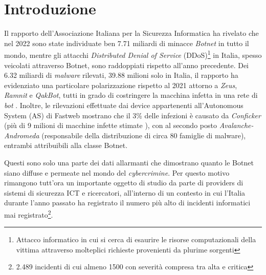 
\chapter{Introduzione}
Il rapporto dell'Associazione Italiana per la Sicurezza Informatica \cite{Clusit} ha rivelato che nel 2022 sono state individuate ben 7.71 miliardi di minacce \textit{Botnet} in tutto il mondo, mentre gli attacchi \textit{Distributed Denial of Service} (DDoS)\footnote{Attacco informatico in cui si cerca di esaurire le risorse computazionali della vittima attraverso molteplici richieste provenienti da plurime sorgenti} in Italia, spesso veicolati attraverso Botnet, sono raddoppiati rispetto all'anno precedente. Dei 6.32 miliardi di \textit{malware} rilevati, 39.88 milioni solo in Italia, il rapporto ha evidenziato una particolare polarizzazione rispetto al 2021 attorno a \textit{Zeus}, \textit{Ramnit} e \textit{QakBot}, tutti in grado di costringere la macchina infetta in una rete di \textit{bot} \cite{FSecureLabsBlogRamnit,CisaQakBot,KaskerkyZeus,IBMSecBlogRamnit}. Inoltre, le rilevazioni effettuate dai device appartenenti all’Autonomous System (AS) di Fastweb mostrano che il 3\% delle infezioni è causato da \textit{Conficker} (più di 9 milioni di macchine infette stimate \cite{FSecureLabsBlogConfickersData}), con al secondo posto \textit{Avalanche-Andromeda} (responsabile della distribuzione di circa 80 famiglie di malware), entrambi attribuibili alla classe Botnet.

Questi sono solo una parte dei dati allarmanti che dimostrano quanto le Botnet siano diffuse e permeate nel mondo del \textit{cybercrimine}. Per questo motivo rimangono tutt’ora un importante oggetto di studio da parte di providers di sistemi di sicurezza ICT e ricercatori, all’interno di un contesto in cui l’Italia durante l’anno passato ha registrato il numero più alto di incidenti informatici mai registrato\footnote{2.489 incidenti di cui almeno 1500 con severità compresa tra alta e critica}.

